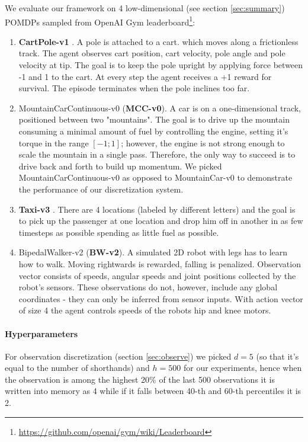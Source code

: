 We evaluate our framework on 4 low-dimensional (see section \ref{sec:summary}) POMDPs sampled from OpenAI Gym \cite{openai-gym} leaderboard\footnote{\url{https://github.com/openai/gym/wiki/Leaderboard}}:

\begin{enumerate}
\item \textbf{CartPole-v1} \cite{cartpole}.
A pole is attached to a cart.  which moves along a frictionless track.
The agent observes cart position, cart velocity, pole angle and pole velocity at tip.
The goal is to keep the pole upright by applying force between -1 and 1 to the cart.
At every step the agent receives a +1 reward for survival.
The episode terminates when the pole inclines too far.
\item MountainCarContinuous-v0 (\textbf{MCC-v0})\cite{mountain_car}.
A car is on a one-dimensional track, positioned between two "mountains". 
The goal is to drive up the mountain consuming a minimal amount of fuel by controlling the engine, setting it's torque in the range $[-1;1]$; however, the engine is not strong enough to scale the mountain in a single pass.
Therefore, the only way to succeed is to drive back and forth to build up momentum. 
We picked MountainCarContinuous-v0 as opposed to MountainCar-v0 to demonstrate the performance of our discretization system.
\item \textbf{Taxi-v3} \cite{taxi}. There are 4 locations (labeled by different letters) and the goal is to pick up the passenger at one location and drop him off in another in as few timesteps as possible spending as little fuel as possible.
\item BipedalWalker-v2 (\textbf{BW-v2}). A simulated 2D robot with legs has to learn how to walk. 
Moving rightwards is rewarded, falling is penalized.
Observation vector consists of speeds, angular speeds and joint positions collected by the robot's sensors.
These observations do not, however, include any global coordinates - they can only be inferred from sensor inputs.
With action vector of size 4 the agent controls speeds of the robots hip and knee motors.
\end{enumerate}

\paragraph{Hyperparameters}

For observation discretization (section \ref{sec:observe}) we picked $d=5$ (so that it's equal to the number of shorthands) and $h=500$ for our experiments, hence when the observation is among the highest 20\% of the last 500 observations it is written into memory as 4 while if it falls between 40-th and 60-th percentiles it is 2.

